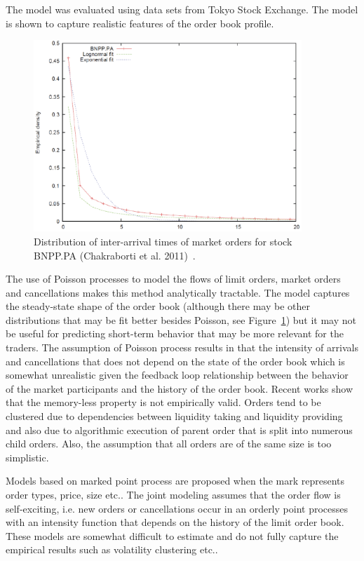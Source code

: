 The model was evaluated using data sets from Tokyo Stock Exchange. The model is shown to capture realistic features of the order book profile.
	\begin{figure}[!ht]
   	\centering
   	\includegraphics[width=0.9\textwidth]{chapters/chapter_trade_data_models/figures/intertime.png} 
   	\caption{Distribution of inter-arrival times of market orders for stock BNPP.PA (Chakraborti et al. 2011)~\cite{chaktokpat}. \label{fig:intertimefig}}
	\end{figure}

The use of Poisson processes to model the flows of limit orders, market orders and cancellations makes this method analytically tractable. The model captures the steady-state shape of the order book (although there may be other distributions that may be fit better besides Poisson, see Figure~\ref{fig:intertimefig}) but it may not be useful for predicting short-term behavior that may be more relevant for the traders. The assumption of Poisson process results in that the intensity of arrivals and cancellations that does not depend on the state of the order book which is somewhat unrealistic given the feedback loop relationship between the behavior of the market participants and the history of the order book. Recent works show that the memory-less property is not empirically valid. Orders tend to be clustered due to dependencies between liquidity taking and liquidity providing and also due to algorithmic execution of parent order that is split into numerous child orders. Also, the assumption that all orders are of the same size is too simplistic. 


Models based on marked point process are proposed when the mark represents order types, price, size etc.. The joint modeling assumes that the order flow is self-exciting, i.e. new orders or cancellations occur in an orderly point processes with an intensity function that depends on the history of the limit order book. These models are somewhat difficult to estimate and do not fully capture the empirical results such as volatility clustering etc.. \\


